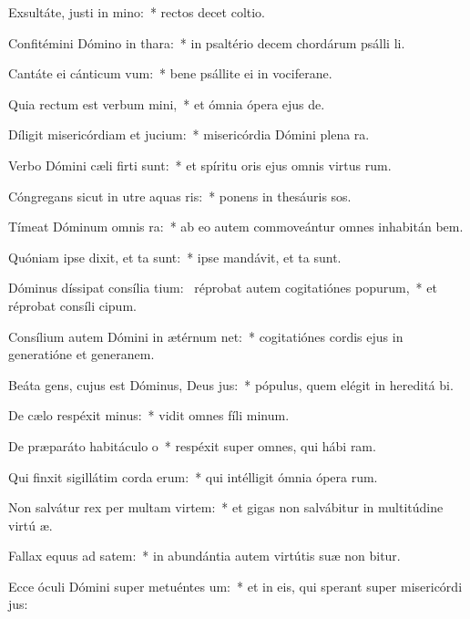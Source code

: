 \item Exsultáte, justi in mino:~* rectos decet coltio.
\item Confitémini Dómino in thara:~* in psaltério decem chordárum psálli li.
\item Cantáte ei cánticum vum:~* bene psállite ei in vociferane.
\item Quia rectum est verbum mini,~* et ómnia ópera ejus  de.
\item Díligit misericórdiam et jucium:~* misericórdia Dómini plena  ra.
\item Verbo Dómini cæli firti sunt:~* et spíritu oris ejus omnis virtus rum.
\item Cóngregans sicut in utre aquas ris:~* ponens in thesáuris sos.
\item Tímeat Dóminum omnis ra:~* ab eo autem commoveántur omnes inhabitán bem.
\item Quóniam ipse dixit, et ta sunt:~* ipse mandávit, et ta sunt.
\item Dóminus díssipat consília tium:~\pscross{} réprobat autem cogitatiónes popurum,~* et réprobat consíli cipum.
\item Consílium autem Dómini in ætérnum net:~* cogitatiónes cordis ejus in generatióne et generanem.
\item Beáta gens, cujus est Dóminus, Deus jus:~* pópulus, quem elégit in hereditá bi.
\item De cælo respéxit minus:~* vidit omnes fíli minum.
\item De præparáto habitáculo o~* respéxit super omnes, qui hábi ram.
\item Qui finxit sigillátim corda erum:~* qui intélligit ómnia ópera rum.
\item Non salvátur rex per multam virtem:~* et gigas non salvábitur in multitúdine virtú æ.
\item Fallax equus ad satem:~* in abundántia autem virtútis suæ non bitur.
\item Ecce óculi Dómini super metuéntes um:~* et in eis, qui sperant super misericórdi jus:
